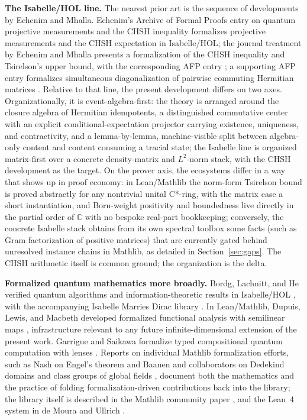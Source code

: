 \documentclass[11pt]{article}
\renewcommand{\_}{\textunderscore\allowbreak}
\theoremstyle{remark}
\newcommand{\C}{\mathbb C}
\begin{document}
\textbf{The Isabelle/HOL line.} The nearest prior art is the sequence of developments by Echenim and Mhalla. Echenim's Archive of Formal Proofs entry on quantum projective measurements and the CHSH inequality \cite{echenim2021afp} formalizes projective measurements and the CHSH expectation in Isabelle/HOL; the journal treatment by Echenim and Mhalla \cite{echenimmhalla2024} presents a formalization of the CHSH inequality and Tsirelson's upper bound, with the corresponding AFP entry \cite{echenimmhalla2023afp}; a supporting AFP entry formalizes simultaneous diagonalization of pairwise commuting Hermitian matrices \cite{echenim2022afp}. Relative to that line, the present development differs on two axes. Organizationally, it is event-algebra-first: the theory is arranged around the closure algebra of Hermitian idempotents, a distinguished commutative center with an explicit conditional-expectation projector carrying existence, uniqueness, and contractivity, and a lemma-by-lemma, machine-visible split between algebra-only content and content consuming a tracial state; the Isabelle line is organized matrix-first over a concrete density-matrix and $L^2$-norm stack, with the CHSH development as the target. On the prover axis, the ecosystems differ in a way that shows up in proof economy: in Lean/Mathlib the norm-form Tsirelson bound is proved abstractly for any nontrivial unital C*-ring, with the matrix case a short instantiation, and Born-weight positivity and boundedness live directly in the partial order of $\C$ with no bespoke real-part bookkeeping; conversely, the concrete Isabelle stack obtains from its own spectral toolbox some facts (such as Gram factorization of positive matrices) that are currently gated behind unresolved instance chains in Mathlib, as detailed in Section~\ref{sec:gaps}. The CHSH arithmetic itself is common ground; the organization is the delta.

\textbf{Formalized quantum mathematics more broadly.} Bordg, Lachnitt, and He verified quantum algorithms and information-theoretic results in Isabelle/HOL \cite{bordg2021}, with the accompanying Isabelle Marries Dirac library \cite{bordg2020afp}. In Lean/Mathlib, Dupuis, Lewis, and Macbeth developed formalized functional analysis with semilinear maps \cite{dupuis2024}, infrastructure relevant to any future infinite-dimensional extension of the present work. Garrigue and Saikawa formalize typed compositional quantum computation with lenses \cite{garrigue2026}. Reports on individual Mathlib formalization efforts, such as Nash on Engel's theorem \cite{nash2023} and Baanen and collaborators on Dedekind domains and class groups of global fields \cite{baanen2022}, document both the mathematics and the practice of folding formalization-driven contributions back into the library; the library itself is described in the Mathlib community paper \cite{mathlib2020}, and the Lean~4 system in de Moura and Ullrich \cite{lean4}.
\end{document}
